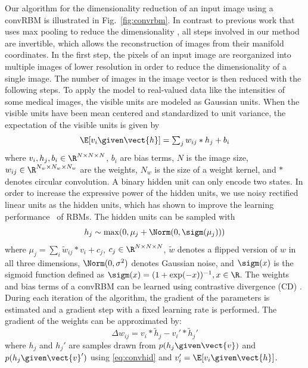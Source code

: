 Our algorithm for the dimensionality reduction of an input image using a
convRBM is illustrated in Fig.~\ref{fig:convrbm}. In contrast to previous work
that uses max pooling to reduce the dimensionality \cite{Lee2011}, all steps
involved in our method are invertible, which allows the reconstruction of
images from their manifold coordinates. In the first step, the pixels of an
input image are reorganized into multiple images of lower resolution in order to
reduce the dimensionality of a single image. The number of images in the image
vector is then reduced with the following steps.
To apply the model to real-valued data like the intensities of some medical
images, the visible units are modeled as Gaussian units. When the visible units have
been mean centered and standardized to unit variance, the expectation of the
visible units is given by
\begin{equation} 
\E[v_i \given \vect{h}] = \textstyle\sum_j w_{ij}*h_j + b_i
\label{eq:convvis}
\end{equation}
where $v_i, h_j, b_i \in \R^{N \times N \times N}$, $b_i$ are bias terms, $N$ is
the image size, $w_{ij} \in \R^{N_w \times N_w \times N_w}$ are the weights,
$N_w$ is the size of a weight kernel, and $*$ denotes circular convolution.
A binary hidden unit can only encode two states. In order to increase the
expressive power of the hidden units, we use noisy rectified
linear units as the hidden units,
which has shown to improve the learning performance~\cite{Nair2010} of RBMs.
The
hidden units can be sampled with
\begin{equation} 
h_j \sim \max(0, \mu_j + \Norm(0, \sigm(\mu_j)))
\label{eq:convhid}
\end{equation} 
where $\mu_j = \textstyle\sum_i\tilde{w}_{ij}*v_i +c_j$, $c_j \in \R^{N \times
N \times N}$, $\tilde{w}$ denotes a flipped version of $w$ in all three
dimensions, $\Norm(0, \sigma^2)$ denotes Gaussian noise, and $\sigm(x)$ is the
sigmoid function defined as $\sigm(x) = (1+ \exp(-x))^{-1}, x \in \R$. The
weights and bias terms of a convRBM can be learned using contrastive
divergence (CD) \cite{Hinton2006b}. During each iteration of the algorithm, the
gradient of the parameters is estimated and a gradient step with a fixed
learning rate is performed. The gradient of the weights can be approximated by:
\begin{equation}
\Delta w_{ij} = v_i*\tilde{h}_j - v_i'*\tilde{h}_j'
\label{eq:convgra}
\end{equation}
where $h_j$ and $h_j'$ are samples drawn from $p(h_j \given \vect{v})$ and
$p(h_j \given \vect{v}')$ using \eqref{eq:convhid} and $v_i' = \E[v_i \given
\vect{h}]$.

